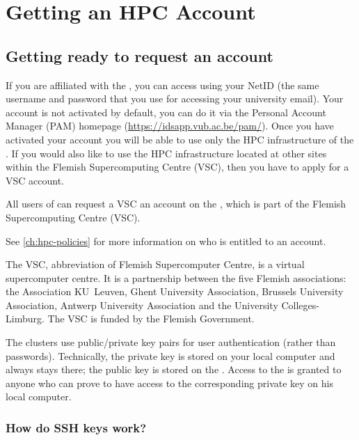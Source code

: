 \chapter{Getting an HPC Account}
\label{ch:getting-a-hpc-account}

\section{Getting ready to request an account}
\label{sec:getting-ready-to-request-an-account}

\ifbrussel
 If you are affiliated with the \university, you can access \hpc using your NetID
 (the same username and password that you use for accessing your university email).
 Your \hpc account is not activated by default, you can do it via the Personal
 Account Manager (PAM) homepage (\url{https://idsapp.vub.ac.be/pam/}).
 Once you have activated your \hpcname account you will be able to use only the HPC
 infrastructure of the \university. If you would also like to use the HPC infrastructure
 located at other sites within the Flemish Supercomputing Centre (VSC), then you have
 to apply for a VSC account.
\fi

All users of \association can request
\ifbrussel
 a VSC
 \else
 an
\fi
account on
the \hpc, which is part of the Flemish Supercomputing Centre (VSC).

See \autoref{ch:hpc-policies} for more information on who is entitled to an account.

The VSC, abbreviation of Flemish Supercomputer Centre, is a virtual
supercomputer centre. It is a partnership between the five Flemish
associations: the Association KU~Leuven,  Ghent University Association, Brussels
University Association, Antwerp University Association and the University
Colleges-Limburg. The VSC is funded by the Flemish Government.


The \hpcInfra clusters use public/private key pairs for user authentication
(rather than passwords). Technically, the private key is stored on your local
computer and always stays there; the public key is stored on the \hpc.
Access to the \hpc is granted to anyone who can prove to have access to the
corresponding private key on his local computer.

\subsection{How do SSH keys work?}
\label{subsec:how-do-ssh-keys-work}

